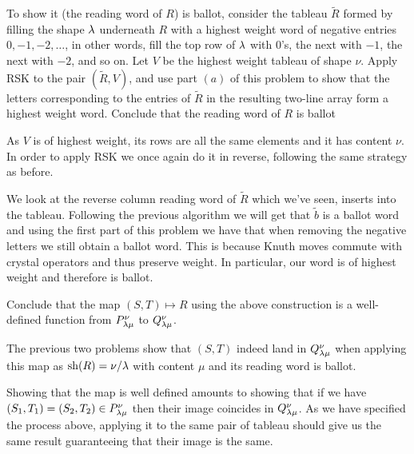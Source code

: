 \documentclass[12pt]{memoir}
\begin{document}
\begin{Ej}[7(c)(ii)]
    To show it (the reading word of $R$) is ballot, consider the tableau $\tilde R$ formed by filling the shape $\lambda$ underneath
$R$ with a highest weight word of negative entries $0,-1,-2,\dots$, in other words, fill the top
row of $\lambda$ with $0$'s, the next with $-1$, the next with $-2$, and so on. Let $V$ be the highest
weight tableau of shape $\nu$. Apply RSK to the pair $( \tilde R, V )$, and use part $(a)$ of this problem
to show that the letters corresponding to the entries of $\tilde R$ in the resulting two-line array form
a highest weight word. Conclude that the reading word of $R$ is ballot
\end{Ej}

\begin{ptcbr}
As $V$ is of highest weight, its rows are all the same elements and it has content $\nu$. In order to apply RSK we once again do it in reverse, following the same strategy as before.\par
We look at the reverse column reading word of $\tilde R$ which we've seen, inserts into the tableau. Following the previous algorithm we will get that $\tilde{b}$ is a ballot word and using the first part of this problem we have that when removing the negative letters we still obtain a ballot word. This is because Knuth moves commute with crystal operators and thus preserve weight. In particular, our word is of highest weight and therefore is ballot.
\end{ptcbr}

\begin{Ej}[7(c)(iii)]
    Conclude that the map $(S,T)\mapsto R$ using the above construction is a well-deﬁned function from $P^\nu_{\lambda\mu}$ to $Q^\nu_{\lambda\mu}$.
\end{Ej}

\begin{ptcbr}
    The previous two problems show that $(S,T)$ indeed land in $Q^\nu_{\lambda\mu}$ when applying this map as $\operatorname{sh}(R)=\nu/\lambda$ with content $\mu$ and its reading word is ballot.\par
    Showing that the map is well defined amounts to showing that if we have $(S_1,T_1)=(S_2,T_2)\in P^\nu_{\lambda\mu}$ then their image coincides in $Q^\nu_{\lambda\mu}$. As we have specified the process above, applying it to the same pair of tableau should give us the same result guaranteeing that their image is the same.
\end{ptcbr}
\end{document}
